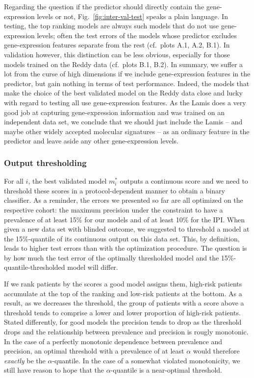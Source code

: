Regarding the question if the predictor should directly contain the gene-expression levels or not,
Fig.\ \ref{fig:inter-val-test} speaks a plain language. In testing, the top ranking models are 
always such models that do not use gene-expression levels; often the test errors of the models whose 
predictor excludes gene-expression features separate from the rest (cf.\ plots A.1, A.2, B.1). In 
validation however, this distinction can be less obvious, especially for those models trained on 
the Reddy data (cf.\ plots B.1, B.2). In summary, we suffer a lot from the curse of high dimensions 
if we include gene-expression features in the predictor, but gain nothing in terms of test 
performance. Indeed, the models that make the choice of the best validated model on the Reddy data 
close and lucky with regard to testing all use gene-expression features. As the Lamis does a very 
good job at capturing gene-expression information and was trained on an independent data set, we 
conclude that we should just include the Lamis -- and maybe other widely accepted molecular 
signatures -- as an ordinary feature in the predictor and leave aside any other gene-expression 
levels.

\subsubsection{Output thresholding}




For all $i$, the best validated model $m_i^*$ outputs a continuous score and we need to threshold 
these scores in a protocol-dependent manner to obtain a binary classifier. As a reminder, the errors 
we presented so far are all optimized on the respective cohort: the maximum precision under the 
constraint to have a prevalence of at least \num{15}\% for our models and of at least \num{10}\% 
for the IPI. When given a new data set with blinded outcome, we suggested to threshold a model at 
the \num{15}\%-quantile of its continuous output on this data set. This, by definition, leads to 
higher test errors than with the optimization procedure. The question is by how much the test error 
of the optimally thresholded model and the \num{15}\%-quantile-thresholded model will differ.

If we rank patients by the scores a good model assigns them, high-risk patients accumulate at the 
top of the ranking and low-risk patients at the bottom. As a result, as we decreases the threshold, 
the group of patients with a score above a threshold tends to comprise a lower and lower proportion 
of high-risk patients. Stated differently, for good models the precision tends to drop as the 
threshold drops and the relationship between prevalence and precision is rougly monotonic. In the 
case of a perfectly monotonic dependence between prevalence and precision, an optimal threshold 
with a prevalence of at least $\alpha$ would therefore \textit{exactly} be the $\alpha$-quantile. 
In the case of a somewhat violated monotonicity, we still have reason to hope that the 
$\alpha$-quantile is a near-optimal threshold.

